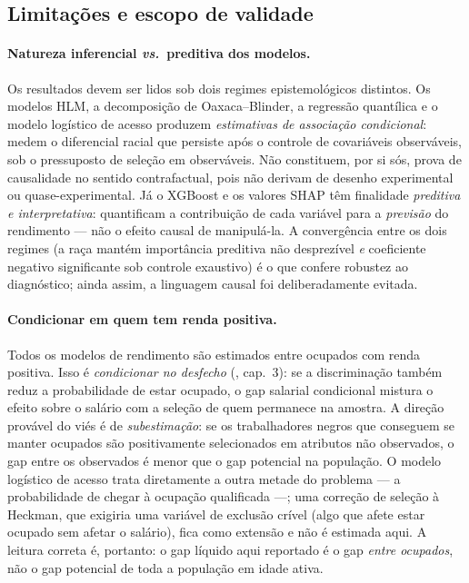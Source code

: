 \documentclass[12pt, a4paper, oneside]{article}
\let\oldsubsectionFB\subsection
\renewcommand{\subsection}{\FloatBarrier\oldsubsectionFB}
\begin{document}
\bigskip

\subsection*{Limitações e escopo de validade}

\paragraph{Natureza inferencial \textit{vs.}\ preditiva dos modelos.}
Os resultados devem ser lidos sob dois regimes epistemológicos distintos.
Os modelos HLM, a decomposição de Oaxaca--Blinder, a regressão quantílica e
o modelo logístico de acesso produzem \textit{estimativas de associação condicional}:
medem o diferencial racial que persiste após o controle de covariáveis
observáveis, sob o pressuposto de seleção em observáveis. Não constituem, por
si sós, prova de causalidade no sentido contrafactual, pois não derivam de
desenho experimental ou quase-experimental. Já o XGBoost e os valores SHAP têm
finalidade \textit{preditiva e interpretativa}: quantificam a contribuição de
cada variável para a \textit{previsão} do rendimento --- não o efeito causal
de manipulá-la. A convergência entre os dois regimes (a raça mantém importância
preditiva não desprezível \textit{e} coeficiente negativo significante sob
controle exaustivo) é o que confere robustez ao diagnóstico; ainda assim, a
linguagem causal foi deliberadamente evitada.

\paragraph{Condicionar em quem tem renda positiva.}
Todos os modelos de rendimento são estimados entre ocupados com renda positiva. Isso é
\emph{condicionar no desfecho} (, cap.~3): se a discriminação
também reduz a probabilidade de estar ocupado, o gap salarial condicional mistura o
efeito sobre o salário com a seleção de quem permanece na amostra. A direção provável do
viés é de \emph{subestimação}: se os trabalhadores negros que conseguem se manter
ocupados são positivamente selecionados em atributos não observados, o gap entre os
observados é menor que o gap potencial na população. O modelo logístico de acesso trata
diretamente a outra metade do problema --- a probabilidade de chegar à ocupação
qualificada ---; uma correção de seleção à Heckman, que exigiria uma variável de
exclusão crível (algo que afete estar ocupado sem afetar o salário), fica como extensão
e não é estimada aqui. A leitura correta é, portanto: o gap líquido aqui reportado
é o gap \emph{entre ocupados}, não o gap potencial de toda a população em idade ativa.
\end{document}
